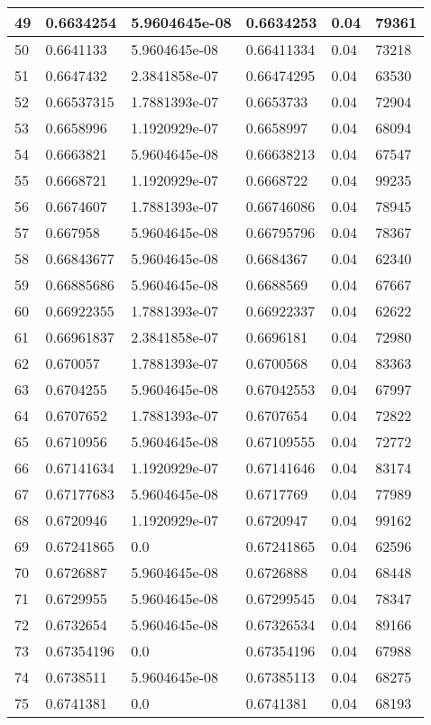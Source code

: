 \begin{longtable}{|l|l|l|l|l|l|}
49 & 0.6634254 & 5.9604645e-08 & 0.6634253 & 0.04 & 79361 \\ \hline 
50 & 0.6641133 & 5.9604645e-08 & 0.66411334 & 0.04 & 73218 \\ \hline 
51 & 0.6647432 & 2.3841858e-07 & 0.66474295 & 0.04 & 63530 \\ \hline 
52 & 0.66537315 & 1.7881393e-07 & 0.6653733 & 0.04 & 72904 \\ \hline 
53 & 0.6658996 & 1.1920929e-07 & 0.6658997 & 0.04 & 68094 \\ \hline 
54 & 0.6663821 & 5.9604645e-08 & 0.66638213 & 0.04 & 67547 \\ \hline 
55 & 0.6668721 & 1.1920929e-07 & 0.6668722 & 0.04 & 99235 \\ \hline 
56 & 0.6674607 & 1.7881393e-07 & 0.66746086 & 0.04 & 78945 \\ \hline 
57 & 0.667958 & 5.9604645e-08 & 0.66795796 & 0.04 & 78367 \\ \hline 
58 & 0.66843677 & 5.9604645e-08 & 0.6684367 & 0.04 & 62340 \\ \hline 
59 & 0.66885686 & 5.9604645e-08 & 0.6688569 & 0.04 & 67667 \\ \hline 
60 & 0.66922355 & 1.7881393e-07 & 0.66922337 & 0.04 & 62622 \\ \hline 
61 & 0.66961837 & 2.3841858e-07 & 0.6696181 & 0.04 & 72980 \\ \hline 
62 & 0.670057 & 1.7881393e-07 & 0.6700568 & 0.04 & 83363 \\ \hline 
63 & 0.6704255 & 5.9604645e-08 & 0.67042553 & 0.04 & 67997 \\ \hline 
64 & 0.6707652 & 1.7881393e-07 & 0.6707654 & 0.04 & 72822 \\ \hline 
65 & 0.6710956 & 5.9604645e-08 & 0.67109555 & 0.04 & 72772 \\ \hline 
66 & 0.67141634 & 1.1920929e-07 & 0.67141646 & 0.04 & 83174 \\ \hline 
67 & 0.67177683 & 5.9604645e-08 & 0.6717769 & 0.04 & 77989 \\ \hline 
68 & 0.6720946 & 1.1920929e-07 & 0.6720947 & 0.04 & 99162 \\ \hline 
69 & 0.67241865 & 0.0 & 0.67241865 & 0.04 & 62596 \\ \hline 
70 & 0.6726887 & 5.9604645e-08 & 0.6726888 & 0.04 & 68448 \\ \hline 
71 & 0.6729955 & 5.9604645e-08 & 0.67299545 & 0.04 & 78347 \\ \hline 
72 & 0.6732654 & 5.9604645e-08 & 0.67326534 & 0.04 & 89166 \\ \hline 
73 & 0.67354196 & 0.0 & 0.67354196 & 0.04 & 67988 \\ \hline 
74 & 0.6738511 & 5.9604645e-08 & 0.67385113 & 0.04 & 68275 \\ \hline 
75 & 0.6741381 & 0.0 & 0.6741381 & 0.04 & 68193 \\ \hline 
\end{longtable}